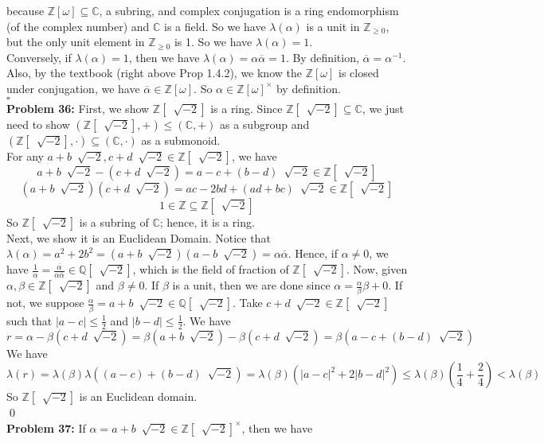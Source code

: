 \documentclass[12pt]{amsart}
\newcommand{\Q}{\mathbb{Q}}
\newcommand{\C}{\mathbb{C}}
\newcommand{\Z}{\mathbb{Z}}
\begin{document}
because $\Z[\omega]\subseteq \C$, a subring, and  complex conjugation is a ring endomorphism (of the complex number) and $\C$ is a field. So we have $\lambda(\alpha)$ is a unit in $\Z_{\geq 0}$, but the only unit element in $\Z_{\geq 0}$ is 1. So we have $\lambda(\alpha)=1$.\\
Conversely, if $\lambda(\alpha)=1$, then we have $\lambda(\alpha)=\alpha\overline{\alpha}=1$. By definition, $\overline{\alpha}=\alpha^{-1}$. Also, by the textbook (right above Prop 1.4.2), we know the $\Z[\omega]$ is closed under conjugation, we have $\overline{\alpha}\in\Z[\omega]$. So $\alpha\in \Z[\omega]^{\times}$ by definition.
\\\phantom{qed}\hfill$\square$\\
\textbf{Problem 36:} First, we show $\Z[\ \sqrt[]{-2}]$ is a ring. Since $\Z[\ \sqrt[]{-2}]\subseteq \C$, we just need to show $(\Z[\ \sqrt[]{-2}],+)\leq (\C,+)$ as a subgroup and $(\Z[\ \sqrt[]{-2}],\cdot)\subseteq (\C,\cdot )$ as a submonoid.\\
For any $a+b\ \sqrt[]{-2},c+d\ \sqrt[]{-2}\in \Z[\ \sqrt[]{-2}]$, we have 
\[a+b\ \sqrt[]{-2}-(c+d\ \sqrt[]{-2})=a-c+(b-d)\ \sqrt[]{-2}\in \Z[\ \sqrt[]{-2}]\]
\[(a+b\ \sqrt[]{-2})(c+d\ \sqrt[]{-2})=ac-2bd+(ad+bc)\ \sqrt[]{-2}\in \Z[\ \sqrt[]{-2}]\]
\[1\in\Z\subseteq \Z[\ \sqrt[]{-2}]\]
So $\Z[\ \sqrt[]{-2}]$ is a subring of $\C$; hence, it is a ring.\\
Next, we show it is an Euclidean Domain. Notice that $\lambda(\alpha)=a^2+2b^2=(a+b\ \sqrt[]{-2})(a-b\ \sqrt[]{-2})=\alpha\overline{\alpha}$. Hence, if $\alpha\neq 0$, we have $\frac{1}{\alpha}=\frac{\overline{\alpha}}{\alpha\overline{\alpha}}\in \Q[\ \sqrt[]{-2}]$, which is the field of fraction of $\Z[\ \sqrt[]{-2}]$. Now, given $\alpha,\beta\in \Z[\ \sqrt[]{-2}]$ and $\beta\neq 0$. If $\beta$ is a unit, then we are done since $\alpha=\frac{\alpha}{\beta}\beta+0$. If not, we suppose $\frac{\alpha}{\beta}=a+b\ \sqrt[]{-2}\in \Q[ \ \sqrt[]{-2}]$. Take $c+d\ \sqrt[]{-2}\in \Z[\ \sqrt[]{-2}]$ such that $|a-c|\leq \frac{1}{2}$ and $|b-d|\leq \frac{1}{2}$. We have 
\[r=\alpha-\beta(c+d\ \sqrt[]{-2})=\beta(a+b\ \sqrt[]{-2})-\beta(c+d\ \sqrt[]{-2})=\beta(a-c+(b-d)\ \sqrt[]{-2})\]
We have 
\[\lambda(r)=\lambda(\beta)\lambda((a-c)+(b-d)\ \sqrt[]{-2})=\lambda(\beta)(|a-c|^2+2|b-d|^2)\leq \lambda(\beta)(\frac{1}{4}+\frac{2}{4})<\lambda(\beta)\]
So $\Z[\ \sqrt[]{-2}]$ is an Euclidean domain.
\\\qed\\
\textbf{Problem 37:} If $\alpha=a+b\ \sqrt[]{-2}\in \Z[\ \sqrt[]{-2}]^\times $, then we have 
\end{document}
